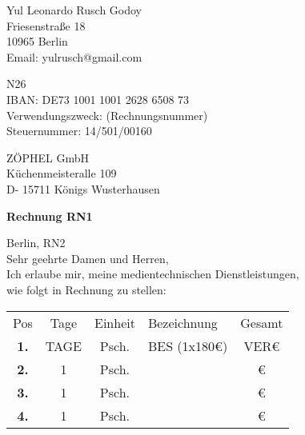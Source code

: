 \documentclass[12pt]{article}
\begin{document}

\begin{flushright}

Yul Leonardo Rusch Godoy\\
Friesenstraße 18\\
10965 Berlin\\
Email: yulrusch@gmail.com\\

\vspace{0.5cm}

N26\\
IBAN: DE73 1001 1001 2628 6508 73\\
Verwendungszweck: (Rechnungsnummer)\\
Steuernummer: 14/501/00160\\

\end{flushright}

\vspace{0.5cm}

\begin{flushleft}

ZÖPHEL GmbH\\
Küchenmeisteralle 109\\
D- 15711 Königs Wusterhausen\\

\vspace{2cm}

\textbf{Rechnung RN1\\}

\vspace{0.5cm}

Berlin, RN2\\
Sehr geehrte Damen und Herren,\\
Ich erlaube mir, meine medientechnischen Dienstleistungen,\\
wie folgt in Rechnung zu stellen:\\

\end{flushleft}

\begin{flushleft}
\begin{tabular}{c c c p{9.7cm} c}
Pos & Tage & Einheit & Bezeichnung & Gesamt\\ 
\rowcolor{lightgrey}
\textbf{1.} & TAGE & Psch. & BES (1x180€) & VER€\\ 
\textbf{2.} & 1 & Psch. &  & €\\ 
\rowcolor{lightgrey}
\textbf{3.} & 1 & Psch. &  & €\\ 
\textbf{4.} & 1 & Psch. &  & €\\ 
\end{tabular}        
\end{flushleft}
\end{document}
